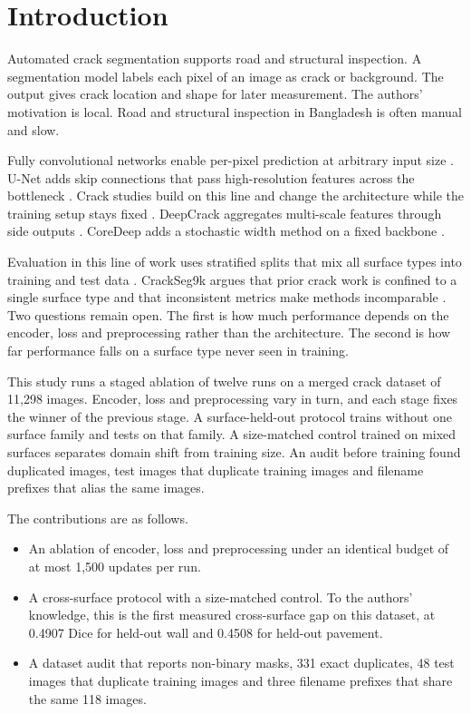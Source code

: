 \documentclass[conference]{IEEEtran}
\begin{document}
\section{Introduction}
Automated crack segmentation supports road and structural inspection. A segmentation model labels each pixel of an image as crack or background. The output gives crack location and shape for later measurement. The authors' motivation is local. Road and structural inspection in Bangladesh is often manual and slow.

Fully convolutional networks enable per-pixel prediction at arbitrary input size \cite{fcn}. U-Net adds skip connections that pass high-resolution features across the bottleneck \cite{unet}. Crack studies build on this line and change the architecture while the training setup stays fixed \cite{deepcrack,coredeep}. DeepCrack aggregates multi-scale features through side outputs \cite{deepcrack}. CoreDeep adds a stochastic width method on a fixed backbone \cite{coredeep}.

Evaluation in this line of work uses stratified splits that mix all surface types into training and test data \cite{coredeep}. CrackSeg9k argues that prior crack work is confined to a single surface type and that inconsistent metrics make methods incomparable \cite{crackseg9k}. Two questions remain open. The first is how much performance depends on the encoder, loss and preprocessing rather than the architecture. The second is how far performance falls on a surface type never seen in training.

This study runs a staged ablation of twelve runs on a merged crack dataset of 11,298 images. Encoder, loss and preprocessing vary in turn, and each stage fixes the winner of the previous stage. A surface-held-out protocol trains without one surface family and tests on that family. A size-matched control trained on mixed surfaces separates domain shift from training size. An audit before training found duplicated images, test images that duplicate training images and filename prefixes that alias the same images.

The contributions are as follows.
\begin{itemize}
\item An ablation of encoder, loss and preprocessing under an identical budget of at most 1,500 updates per run.
\item A cross-surface protocol with a size-matched control. To the authors' knowledge, this is the first measured cross-surface gap on this dataset, at 0.4907 Dice for held-out wall and 0.4508 for held-out pavement.
\item A dataset audit that reports non-binary masks, 331 exact duplicates, 48 test images that duplicate training images and three filename prefixes that share the same 118 images.
\end{itemize}
\end{document}
